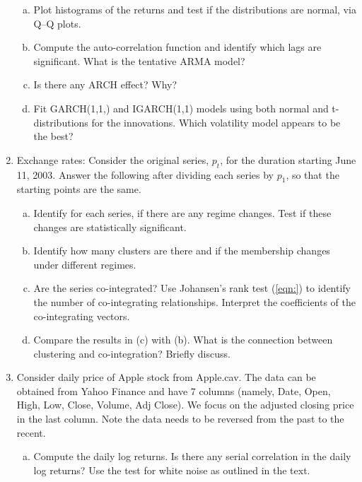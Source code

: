 \begin{enumerate}[1.]
\begin{enumerate}[(a)]
\item Plot histograms of the returns and test if the distributions are normal, via Q--Q plots.

\item Compute the auto-correlation function and identify which lags are significant. What is the tentative ARMA model?

\item Is there any ARCH effect? Why?

\item Fit GARCH(1,1,) and IGARCH(1,1) models using both normal and t-distributions for the innovations. Which volatility model appears to be the best?
\end{enumerate}

 \item Exchange rates: Consider the original series, $p_t$, for the duration starting June 11, 2003.
 Answer the following after dividing each series by $p_1$, so that the starting points are the same.
\begin{enumerate}[(a)]
\item Identify for each series, if there are any regime changes. Test if these changes are statistically significant.

\item Identify how many clusters are there and if the membership changes under different regimes.

\item Are the series co-integrated? Use Johansen's rank test (\ref{eqn:}) to identify the number of co-integrating relationships. Interpret the coefficients of the co-integrating vectors.

\item Compare the results in (c)  with (b). What is the connection between clustering and co-integration? Briefly discuss.
\end{enumerate}


\item Consider daily price of Apple stock from Apple.cav. The data can be obtained from Yahoo Finance and have 7 columns (namely, Date, Open, High, Low, Close, Volume, Adj Close). We focus on the adjusted closing price in the last column. Note the data needs to be reversed from the past to the recent. 
\begin{enumerate}[(a)]
\item Compute the daily log returns. Is there any serial correlation in the daily log returns? Use the test for white noise as outlined in the text. 


\end{enumerate}
\end{enumerate}
